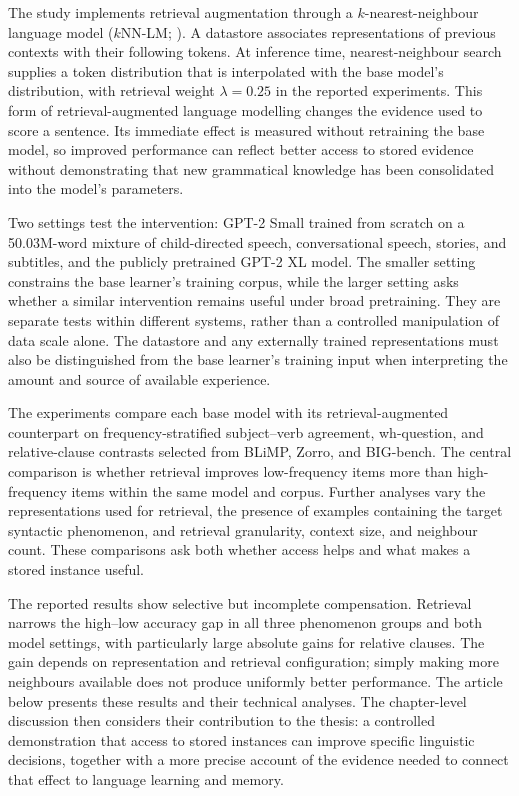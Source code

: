 The study implements retrieval augmentation through a $k$-nearest-neighbour language model ($k$NN-LM; \citealt{khandelwal2020knnlm}). A datastore associates representations of previous contexts with their following tokens. At inference time, nearest-neighbour search supplies a token distribution that is interpolated with the base model's distribution, with retrieval weight $\lambda=0.25$ in the reported experiments. This form of retrieval-augmented language modelling changes the evidence used to score a sentence. Its immediate effect is measured without retraining the base model, so improved performance can reflect better access to stored evidence without demonstrating that new grammatical knowledge has been consolidated into the model's parameters.

Two settings test the intervention: GPT-2 Small trained from scratch on a 50.03M-word mixture of child-directed speech, conversational speech, stories, and subtitles, and the publicly pretrained GPT-2 XL model. The smaller setting constrains the base learner's training corpus, while the larger setting asks whether a similar intervention remains useful under broad pretraining. They are separate tests within different systems, rather than a controlled manipulation of data scale alone. The datastore and any externally trained representations must also be distinguished from the base learner's training input when interpreting the amount and source of available experience.

The experiments compare each base model with its retrieval-augmented counterpart on frequency-stratified subject--verb agreement, wh-question, and relative-clause contrasts selected from BLiMP, Zorro, and BIG-bench. The central comparison is whether retrieval improves low-frequency items more than high-frequency items within the same model and corpus. Further analyses vary the representations used for retrieval, the presence of examples containing the target syntactic phenomenon, and retrieval granularity, context size, and neighbour count. These comparisons ask both whether access helps and what makes a stored instance useful.

The reported results show selective but incomplete compensation. Retrieval narrows the high--low accuracy gap in all three phenomenon groups and both model settings, with particularly large absolute gains for relative clauses. The gain depends on representation and retrieval configuration; simply making more neighbours available does not produce uniformly better performance. The article below presents these results and their technical analyses. The chapter-level discussion then considers their contribution to the thesis: a controlled demonstration that access to stored instances can improve specific linguistic decisions, together with a more precise account of the evidence needed to connect that effect to language learning and memory.
